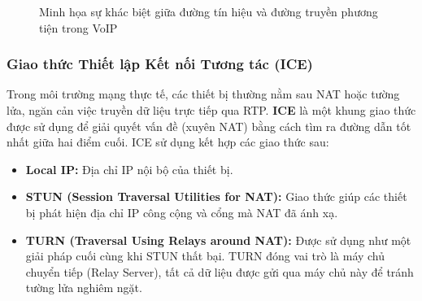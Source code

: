 \begin{figure}[htb!] 
\centering
{}
\caption{Minh họa sự khác biệt giữa đường tín hiệu và đường truyền phương tiện trong VoIP}
\label{fig:sip-media-path-distinction} 
\end{figure}

\subsubsection{Giao thức Thiết lập Kết nối Tương tác (ICE)}
\label{subsubsec:ice_protocol}

Trong môi trường mạng thực tế, các thiết bị thường nằm sau NAT hoặc tường lửa, ngăn cản việc truyền dữ liệu trực tiếp qua RTP. \textbf{ICE} là một khung giao thức được sử dụng để giải quyết vấn đề (xuyên NAT) bằng cách tìm ra đường dẫn tốt nhất giữa hai điểm cuối. ICE sử dụng kết hợp các giao thức sau:

\begin{itemize}
    \item \textbf{Local IP:} Địa chỉ IP nội bộ của thiết bị.
    \item \textbf{STUN (Session Traversal Utilities for NAT):} Giao thức giúp các thiết bị phát hiện địa chỉ IP công cộng và cổng mà NAT đã ánh xạ.
    \item \textbf{TURN (Traversal Using Relays around NAT):} Được sử dụng như một giải pháp cuối cùng khi STUN thất bại. TURN đóng vai trò là máy chủ chuyển tiếp (Relay Server), tất cả dữ liệu được gửi qua máy chủ này để tránh tường lửa nghiêm ngặt.
\end{itemize}

